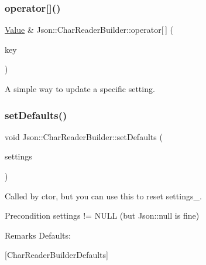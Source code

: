 \mbox{\label{classJson_1_1CharReaderBuilder_a84b35ef443340c06c0aa7b47851d8d86}} 
\subsubsection{\texorpdfstring{operator[]()}{operator[]()}}
{\footnotesize\ttfamily \hyperlink{classJson_1_1Value}{Value} \& Json\+::\+Char\+Reader\+Builder\+::operator\mbox{[}$\,$\mbox{]} (\begin{DoxyParamCaption}\item[{J\+S\+O\+N\+C\+P\+P\+\_\+\+S\+T\+R\+I\+NG}]{key }\end{DoxyParamCaption})}

A simple way to update a specific setting. \mbox{\label{classJson_1_1CharReaderBuilder_a03ff031e06aabff989ab4addc87294ab}} 
\subsubsection{\texorpdfstring{set\+Defaults()}{setDefaults()}}
{\footnotesize\ttfamily void Json\+::\+Char\+Reader\+Builder\+::set\+Defaults (\begin{DoxyParamCaption}\item[{\hyperlink{classJson_1_1Value}{Json\+::\+Value} $\ast$}]{settings }\end{DoxyParamCaption})\hspace{0.3cm}{\ttfamily [static]}}

Called by ctor, but you can use this to reset settings\+\_\+. \begin{DoxyPrecond}{Precondition}
\textquotesingle{}settings\textquotesingle{} != N\+U\+LL (but Json\+::null is fine) 
\end{DoxyPrecond}
\begin{DoxyRemark}{Remarks}
Defaults\+: 
\begin{DoxyCodeInclude}
\end{DoxyCodeInclude}

\end{DoxyRemark}
\mbox{[}Char\+Reader\+Builder\+Defaults\mbox{]}

